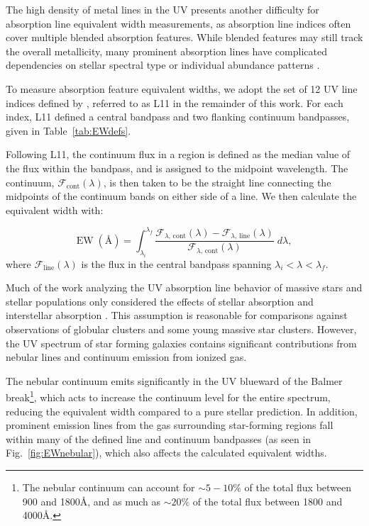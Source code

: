 \documentclass[preprint2,trackchanges]{aastex62}
\newcommand{\ang}{\ensuremath{\mbox{\AA}}\xspace}
\newcommand{\fcont}{\ensuremath{\mathcal{F}_{\mathrm{cont}}(\lambda)}\xspace}
\newcommand{\fline}{\ensuremath{\mathcal{F}_{\mathrm{line}}(\lambda)}\xspace}
\begin{document}
The high density of metal lines in the UV presents another difficulty for absorption line equivalent width measurements, as absorption line indices often cover multiple blended absorption features. While blended features may still track the overall metallicity, many prominent absorption lines have complicated dependencies on stellar spectral type or individual abundance patterns \citep{Maraston+2009}.

To measure absorption feature equivalent widths, we adopt the set of 12 UV line indices defined by \citet{Leitherer+2011}, referred to as L11 in the remainder of this work. For each index, L11 defined a central bandpass and two flanking continuum bandpasses, given in Table~\ref{tab:EWdefs}.

Following L11, the continuum flux in a region is defined as the median value of the flux within the bandpass, and is assigned to the midpoint wavelength. The continuum, \fcont, is then taken to be the straight line connecting the midpoints of the continuum bands on either side of a line. We then calculate the equivalent width with:

\begin{equation}
\mathrm{EW\;(\ang)} = \int^{\lambda_f}_{\lambda_i} \frac{\mathcal{F}_{\lambda,\,\mathrm{cont}}(\lambda) - \mathcal{F}_{\lambda,\,\mathrm{line}}(\lambda)}{\mathcal{F}_{\lambda,\,\mathrm{cont}}(\lambda)}\;d\lambda ,
\end{equation}
where \fline is the flux in the central bandpass spanning $\lambda_i < \lambda < \lambda_f$.

Much of the work analyzing the UV absorption line behavior of massive stars and stellar populations only considered the effects of stellar absorption and interstellar absorption \citep[e.g.,][]{Rix+2004, Maraston+2009, Leitherer+2011,Zetterlund+2015}. This assumption is reasonable for comparisons against observations of globular clusters and some young massive star clusters. However, the UV spectrum of star forming galaxies contains significant contributions from nebular lines and continuum emission from ionized gas. 

The nebular continuum emits significantly in the UV blueward of the Balmer break\footnote{The nebular continuum can account for $\sim5-10\%$ of the total flux between 900 and 1800\ang, and as much as $\sim20\%$ of the total flux between 1800 and 4000\ang\citep{Byler+2017}.}, which acts to increase the continuum level for the entire spectrum, reducing the equivalent width compared to a pure stellar prediction. In addition, prominent emission lines from the gas surrounding star-forming regions fall within many of the defined line and continuum bandpasses (as seen in Fig.~\ref{fig:EWnebular}), which also affects the calculated equivalent widths.
\end{document}
